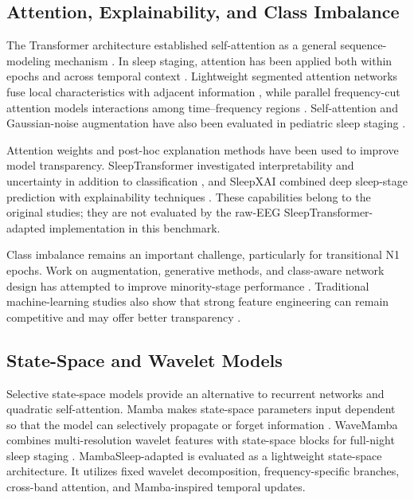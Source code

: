 \documentclass[conference]{IEEEtran}
\begin{document}
\subsection{Attention, Explainability, and Class Imbalance}

The Transformer architecture established self-attention as a general sequence-modeling mechanism \cite{vaswani2017attention}. In sleep staging, attention has been applied both within epochs and across temporal context \cite{eldele2021attention,phan2022sleeptransformer}. Lightweight segmented attention networks fuse local characteristics with adjacent information \cite{zhou2022lightweight}, while parallel frequency-cut attention models interactions among time--frequency regions \cite{chen2023frequencycut}. Self-attention and Gaussian-noise augmentation have also been evaluated in pediatric sleep staging \cite{huang2023children}.

Attention weights and post-hoc explanation methods have been used to improve model transparency. SleepTransformer investigated interpretability and uncertainty in addition to classification \cite{phan2022sleeptransformer}, and SleepXAI combined deep sleep-stage prediction with explainability techniques \cite{dutt2023sleepxai}. These capabilities belong to the original studies; they are not evaluated by the raw-EEG SleepTransformer-adapted implementation in this benchmark.

Class imbalance remains an important challenge, particularly for transitional N1 epochs. Work on augmentation, generative methods, and class-aware network design has attempted to improve minority-stage performance \cite{zhou2022imbalance}. Traditional machine-learning studies also show that strong feature engineering can remain competitive and may offer better transparency \cite{vandonckt2023traditional,lal2023temporal}.

\subsection{State-Space and Wavelet Models}

Selective state-space models provide an alternative to recurrent networks and quadratic self-attention. Mamba makes state-space parameters input dependent so that the model can selectively propagate or forget information \cite{gu2023mamba}. WaveMamba combines multi-resolution wavelet features with state-space blocks for full-night sleep staging \cite{sano2025wavemamba}. MambaSleep-adapted is evaluated as a lightweight state-space architecture. It utilizes fixed wavelet decomposition, frequency-specific branches, cross-band attention, and Mamba-inspired temporal updates.
\end{document}
